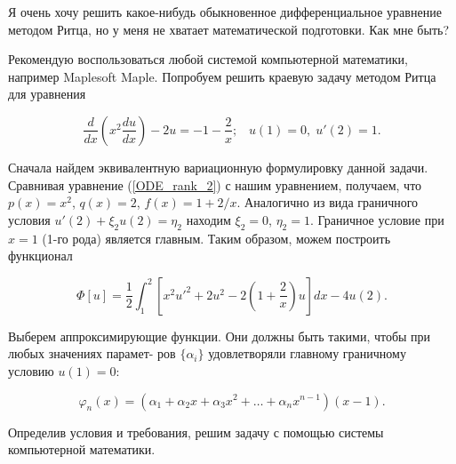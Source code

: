 \newpage
\begin{question}
	Я очень хочу решить какое-нибудь обыкновенное дифференциальное уравнение методом Ритца, но у меня не хватает математической подготовки. Как мне быть?
\end{question}

Рекомендую воспользоваться любой системой компьютерной математики, например Maplesoft Maple. Попробуем решить краевую задачу методом Ритца для уравнения

\begin{displaymath}
	\frac{d}{dx} \left( x^{2} \frac{du}{dx} \right) - 2u = -1 - \frac{2}{x}; \; \; \; u(1) = 0, \; u'(2) = 1.
\end{displaymath}

Сначала найдем эквивалентную вариационную формулировку данной задачи. Сравнивая уравнение (\ref{ODE_rank_2}) с нашим уравнением, получаем, что $p(x) = x^{2}$, $q(x) = 2$, $f(x) = 1 + 2/x$. Аналогично из вида граничного условия $u'(2) + \xi_{2} u(2) = \eta_{2}$ находим $\xi_{2} = 0$, $\eta_{2} = 1$. Граничное условие при $x = 1$ (1-го рода) является главным. Таким образом, можем построить функционал

\begin{displaymath}
	\Phi[u] = \frac{1}{2} \int_{1}^{2} \left[ x^{2} u'^{2} + 2 u^{2} - 2 \left( 1 + \frac{2}{x} \right) u \right] dx - 4 u(2).
\end{displaymath}

Выберем аппроксимирующие функции. Они должны быть такими, чтобы при любых значениях парамет-
ров $\{\alpha_{i}\}$ удовлетворяли главному граничному условию $u(1) = 0$:

\begin{displaymath}
	\varphi_{n}(x) = (\alpha_{1} + \alpha_{2}x + \alpha_{3}x^{2} + \dots + \alpha_{n}x^{n-1}) (x-1).
\end{displaymath}

Определив условия и требования, решим задачу с помощью системы компьютерной математики.

